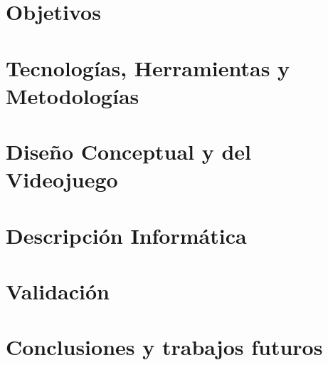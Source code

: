 \documentclass[12pt,twoside,titlepage]{report}
\begin{document}


\chapter{Objetivos}
\label{obj}


\blankpage

\chapter{Tecnologías, Herramientas y Metodologías}
\label{chap:tecnologias}





\chapter{Diseño Conceptual y del Videojuego}
\label{sec:descripcionJuegos}



\blankpage




\chapter{Descripción Informática}
\label{sec:descripcionInformatica}



\blankpage




\chapter{Validación}
\label{sec:validacion}



\blankpage


\chapter{Conclusiones y trabajos futuros}



\blankpage
\end{document}
